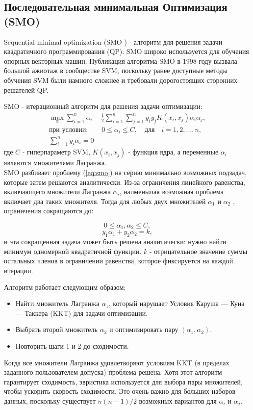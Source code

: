 \documentclass[12pt,a4paper]{article}
\begin{document}
	\subsection{Последовательная минимальная Оптимизация (SMO)}
	Sequential minimal optimization (SMO ) - алгоритм для решения задачи квадратичного программирования (QP).  SMO широко используется для обучения опорных векторных машин. Публикация алгоритма SMO в 1998 году вызвала большой ажиотаж в сообществе SVM, поскольку ранее доступные методы обучения SVM были намного сложнее и требовали дорогостоящих сторонних решателей QP.
	
	SMO - итерационный алгоритм для решения задачи оптимизации:
	\begin{align*}
		\max_{\alpha}\sum_{i=1}^{n}\alpha_{i}-{\frac{1}{2}}\sum_{i=1}^{n}\sum_{j=1}^{n}y_{i}y_{j}K(x_{i},x_{j})\alpha_{i}\alpha_{j},\\	
		 \mbox{при условии:} \qquad
		0\leq \alpha_{i}\leq C, \quad \mbox{для}\quad i=1,2,\ldots ,n,	\\
		\sum_{i=1}^{n}y_{i}\alpha_{i}=0
	\end{align*}\label{eq:smo}
где $C$ - гиперпараметр SVM, $K(x_i, x_j)$ - функция ядра, а переменные $\alpha_{i}$ являются множителями Лагранжа.\\
	

	 SMO разбивает проблему (\ref{eq:smo}) на серию минимально возможных подзадач, которые затем решаются аналитически. Из-за ограничения линейного равенства, включающего множители Лагранжа $\alpha_{i}$, наименьшая возможная проблема включает два таких множителя. Тогда для любых двух множителей $\alpha_{1}$ и $\alpha_{2}$ , ограничения сокращаются до:
	
$$0 \leq \alpha_{1}, \alpha_{2} \leq C,$$
$$ y_{1}\alpha_{1} + y_{2}\alpha_{2} = k,$$ 
	и эта сокращенная задача может быть решена аналитически: нужно найти минимум одномерной квадратичной функции. $k$ - отрицательное значение суммы остальных членов в ограничении равенства, которое фиксируется на каждой итерации.
	
	Алгоритм работает следующим образом:
	
	\begin{itemize}
		\item Найти множитель Лагранжа $\alpha_{1}$, который нарушает Условия Каруша — Куна — Таккера (KKT) для задачи оптимизации.
		\item Выбрать второй множитель $\alpha_{2}$ и оптимизировать пару $(\alpha_{1}, \alpha_{2})$.
		\item Повторить шаги 1 и 2 до сходимости.
	\end{itemize}	
	
	Когда все множители Лагранжа удовлетворяют условиям KKT (в пределах заданного пользователем допуска) проблема решена. Хотя этот алгоритм гарантирует сходимость, эвристика используется для выбора пары множителей, чтобы ускорить скорость сходимости. Это очень важно для больших наборов данных, поскольку существует $n(n-1)/2$ возможных вариантов для $\alpha_{i}$ и $\alpha_{j}$.
	
\end{document}
